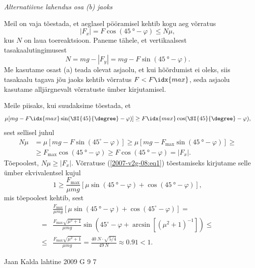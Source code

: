 \documentclass[11pt]{article}
\begin{document}
{{\vspace{0.5\baselineskip}

\emph{Alternatiivne lahendus osa (b) jaoks} 

Meil on vaja tõestada, et aeglasel pööramisel kehtib kogu aeg võrratus
\[
\left|F_{x}\right|=F \cos \left(\SI{45}{\degree}-\varphi\right) \leq N \mu,
\]
kus $N$ on laua toereaktsioon. Paneme tähele, et vertikaalsest tasakaalutingimusest
\[
N=m g-\left|F_{y}\right|=m g-F \sin \left(\SI{45}{\degree}-\varphi\right).
\]
Me kasutame osast (a) teada olevat asjaolu, et kui hõõrdumist ei oleks, siis tasakaalu tagava jõu jaoks kehtib võrratus $F < F\idx{max}$, seda asjaolu kasutame alljärgnevalt võrratuste ümber kirjutamisel.

Meile piisaks, kui suudaksime tõestada, et
\begin{equation}\label{2007-v2g-08:eq1}
\mu [mg - F\idx{max} \sin (\SI{45}{\degree} - \varphi )] \geq F\idx{max} \cos (\SI{45}{\degree} - \varphi ),
\end{equation}
sest sellisel juhul
\[
\begin{aligned}
N \mu &=\mu\left[m g-F \sin \left(45^{\circ}-\varphi\right)\right] \geq \mu\left[m g-F_{\max } \sin \left(\SI{45}{\degree}-\varphi\right)\right] \geq \\ & \geq F_{\max } \cos \left(\SI{45}{\degree}-\varphi\right) \geq F \cos \left(\SI{45}{\degree}-\varphi\right)=\left|F_{x}\right|.
\end{aligned}
\]
Tõepoolest, $N\mu \geq |F_x|$. Võrratuse (\ref{2007-v2g-08:eq1}) tõestamiseks kirjutame selle ümber ekvivalentsel kujul
\[
1 \geq \frac{F_{\max }}{\mu m g}\left[\mu \sin \left(\SI{45}{\degree}-\varphi\right)+\cos \left(\SI{45}{\degree}-\varphi\right)\right],
\]
mis tõepoolest kehtib, sest
\[
\begin{aligned} 
& \frac{F_{\max }}{\mu m g}\left[\mu \sin \left(\SI{45}{\degree}-\varphi\right)+\cos \left(45^{\circ}-\varphi\right)\right]=\\=& \frac{F_{\max } \sqrt{\mu^{2}+1}}{\mu m g} \sin \left(45^{\circ}-\varphi+\arcsin \left[\left(\mu^{2}+1\right)^{-1}\right]\right) \leq \\ \leq & \frac{F_{\max } \sqrt{\mu^{2}+1}}{\mu m g}=\frac{\SI{40}{N} \cdot \sqrt{5 / 4}}{\SI{49}{N}} \approx \num{0,91}<1. 
\end{aligned}
\]
\fi
}

{Jaan Kalda} %
{lahtine} %
{2009} %
{G 9} %
{7} %
{

}}
\end{document}
